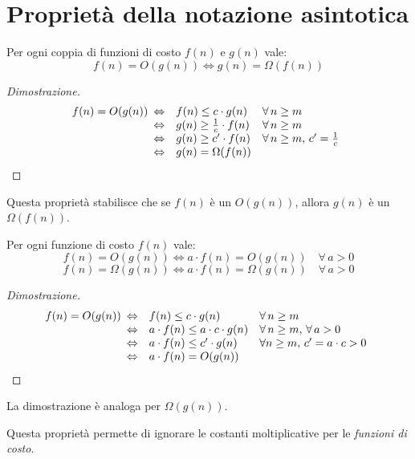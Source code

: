 \section{Proprietà della notazione asintotica}
\begin{definition}
    Per ogni coppia di funzioni di costo $f(n)$ e $g(n)$ vale:
    \[f(n)=O(g(n))\Leftrightarrow g(n)=\Omega(f(n))\]
\end{definition}
\begin{proof}[Dimostrazione]
    \[f(n)=O(g(n))\begin{array}[t]{cll}
        \Leftrightarrow & f(n)\leq c\cdot g(n) & \forall\,n\geq m\\
        \Leftrightarrow & g(n)\geq\frac{1}{c}\cdot f(n) & \forall\,n\geq m\\
        \Leftrightarrow & g(n)\geq c'\cdot f(n) & \forall\,n\geq m,\,c'=\frac{1}{c}\\
        \Leftrightarrow & g(n)=\Omega(f(n)) &
    \end{array}\]
\end{proof}\noindent
Questa proprietà stabilisce che se $f(n)$ è un $O(g(n))$, allora $g(n)$ è un
$\Omega(f(n))$.

\begin{definition}
    Per ogni funzione di costo $f(n)$ vale:
    \[f(n)=O(g(n))\Leftrightarrow a\cdot f(n)=O(g(n))\quad\forall\, a>0\]
    \[f(n)=\Omega(g(n))\Leftrightarrow a\cdot f(n)=\Omega(g(n))\quad\forall\, a>0\]
\end{definition}
\begin{proof}[Dimostrazione]
    \[f(n)=O(g(n))\begin{array}[t]{cll}
        \Leftrightarrow & f(n)\leq c\cdot g(n) & \forall\,n\geq m\\
        \Leftrightarrow & a\cdot f(n)\leq a\cdot c\cdot g(n) & \forall\,n\geq m,\,\forall\,a>0\\
        \Leftrightarrow & a\cdot f(n)\leq c'\cdot g(n) & \forall n\geq m,\,c'=a\cdot c>0\\
        \Leftrightarrow & a\cdot f(n)=O(g(n)) &
    \end{array}\]
\end{proof}
\begin{note}
    La dimostrazione è analoga per $\Omega(g(n))$.
\end{note}\noindent
Questa proprietà permette di ignorare le costanti moltiplicative per le
\emph{funzioni di costo}.

